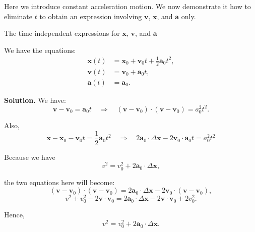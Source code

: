 \documentclass[10pt]{article}
\begin{document}
	Here we introduce constant acceleration motion. We now demonstrate it how to eliminate $t$ to obtain an expression involving $\mathbf{v}$, $\mathbf{x}$, and $\mathbf{a}$ only.
	\begin{definition}
		The time independent expressions for $\mathbf{x}$, $\mathbf{v}$, and $\mathbf{a}$

		\vspace{2\baselineskip}
		We have the equations:
		\begin{equation}
		  \begin{aligned}
		  \mathbf{x}(t) &= \mathbf{x}_{0} + \mathbf{v}_{0}t + \frac{1}{2} \mathbf{a}_{0}t^{2}, \\
		  \mathbf{v}(t) &= \mathbf{v}_{0} + \mathbf{a}_{0} t, \\
		  \mathbf{a}(t) &= \mathbf{a}_{0}.
		  \end{aligned}
		\end{equation}

		\vspace{1\baselineskip}
		\textbf{Solution.} We have:
		\begin{equation}
		\mathbf{v} - \mathbf{v}_{0} = \mathbf{a}_{0} t \quad \Rightarrow \quad \left( \mathbf{v} - \mathbf{v}_{0} \right) \cdot \left( \mathbf{v} - \mathbf{v}_{0} \right) = a_0^{2} t ^{2}. 
		\end{equation}

		Also,
		\begin{equation}
		  \mathbf{x} - \mathbf{x}_{0} - \mathbf{v}_{0} t = \frac{1}{2} \mathbf{a}_{0}t ^{2} \quad \Rightarrow \quad 2 \mathbf{a}_{0} \cdot \Delta \mathbf{x} - 2 \mathbf{v}_{0} \cdot \mathbf{a}_{0} t = a_0^{2}t ^{2}
		\end{equation}

		Because we have
		\begin{equation}
		  v^{2} = v_{0}^{2} + 2\mathbf{a}_{0} \cdot \Delta \mathbf{x},
		\end{equation}
	
		the two equations here will become:
		\begin{equation}
		\left( \mathbf{v} - \mathbf{v}_{0} \right) \cdot \left( \mathbf{v} - \mathbf{v}_{0} \right) = 2\mathbf{a}_{0} \cdot \Delta \mathbf{x} - 2\mathbf{v}_{0} \cdot \left( \mathbf{v} - \mathbf{v}_{0} \right), 
		\end{equation}
		\begin{equation}
		v^{2} + v_0^{2} - 2 \mathbf{v}\cdot \mathbf{v}_{0} = 2\mathbf{a}_{0} \cdot \Delta \mathbf{x} - 2 \mathbf{v} \cdot \mathbf{v}_{0} + 2v_0^{2}.
		\end{equation}

		Hence,
		\begin{equation}
		  v^{2} = v_0^{2} + 2\mathbf{a}_{0} \cdot \Delta \mathbf{x}.
		\end{equation}
	\end{definition}
\end{document}
